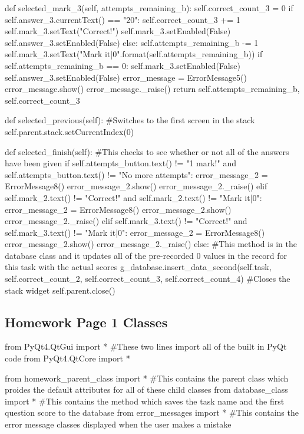 \begin{landscape}
\begin{python}
    def selected_mark_3(self, attempts_remaining_b):
        self.correct_count_3 = 0
        if self.answer_3.currentText() == "20":
            self.correct_count_3 += 1
            self.mark_3.setText("Correct!")
            self.mark_3.setEnabled(False)
            self.answer_3.setEnabled(False)
        else:
            self.attempts_remaining_b -= 1
            self.mark_3.setText("Mark it|{0}".format(self.attempts_remaining_b))
            if self.attempts_remaining_b == 0:
                self.mark_3.setEnabled(False)
                self.answer_3.setEnabled(False)
            error_message = ErrorMessage5()
            error_message.show()
            error_message._raise()
        return self.attempts_remaining_b, self.correct_count_3

    def selected_previous(self):
        #Switches to the first screen in the stack
        self.parent.stack.setCurrentIndex(0)

    def selected_finish(self):
        #This checks to see whether or not all of the answers have been given
        if self.attempts_button.text() != "1 mark!" and self.attempts_button.text() != "No more attempts":
            error_message_2 = ErrorMessage8()
            error_message_2.show()
            error_message_2._raise()
        elif self.mark_2.text() != "Correct!" and self.mark_2.text() != "Mark it|0":
            error_message_2 = ErrorMessage8()
            error_message_2.show()
            error_message_2._raise()
        elif self.mark_3.text() != "Correct!" and self.mark_3.text() != "Mark it|0":
            error_message_2 = ErrorMessage8()
            error_message_2.show()
            error_message_2._raise()
        else:
            #This method is in the database class and it updates all of the pre-recorded 0 values in the record for this task with the actual scores
            g_database.insert_data_second(self.task, self.correct_count_2, self.correct_count_3, self.correct_count_4)
            #Closes the stack widget
            self.parent.close()
\end{python}

\subsection{Homework Page 1 Classes}

\begin{python}
from PyQt4.QtGui import * #These two lines import all of the built in PyQt code
from PyQt4.QtCore import *

from homework_parent_class import * #This contains the parent class which proides the default attributes for all of these child classes
from database_class import * #This contains the method which saves the task name and the first question score to the database
from error_messages import * #This contains the error message classes displayed when the user makes a mistake
\end{python}


\end{landscape}
